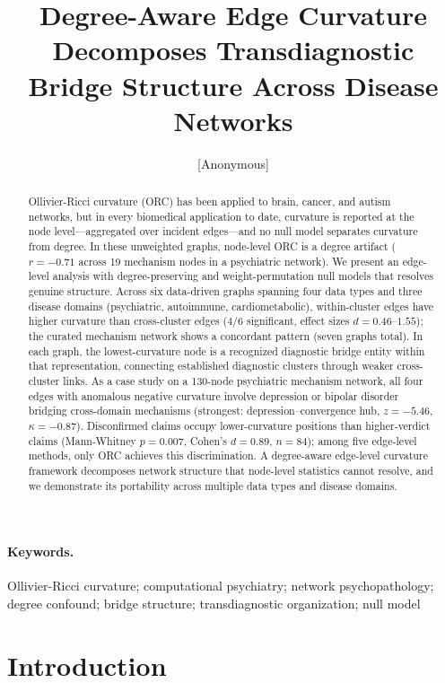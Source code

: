 \documentclass[11pt]{article}
\title{Degree-Aware Edge Curvature Decomposes Transdiagnostic Bridge Structure Across Disease Networks}
\author{[Anonymous]}
\affil{[Affiliation withheld for peer review]}
\date{}
\begin{document}
\maketitle

\begin{abstract}
Ollivier-Ricci curvature (ORC) has been applied to brain, cancer, and autism networks, but in every biomedical application to date, curvature is reported at the node level---aggregated over incident edges---and no null model separates curvature from degree. In these unweighted graphs, node-level ORC is a degree artifact ($r = -0.71$ across 19 mechanism nodes in a psychiatric network). We present an edge-level analysis with degree-preserving and weight-permutation null models that resolves genuine structure. Across six data-driven graphs spanning four data types and three disease domains (psychiatric, autoimmune, cardiometabolic), within-cluster edges have higher curvature than cross-cluster edges (4/6 significant, effect sizes $d = 0.46$--$1.55$); the curated mechanism network shows a concordant pattern (seven graphs total). In each graph, the lowest-curvature node is a recognized diagnostic bridge entity within that representation, connecting established diagnostic clusters through weaker cross-cluster links. As a case study on a 130-node psychiatric mechanism network, all four edges with anomalous negative curvature involve depression or bipolar disorder bridging cross-domain mechanisms (strongest: depression--convergence hub, $z = -5.46$, $\kappa = -0.87$). Disconfirmed claims occupy lower-curvature positions than higher-verdict claims (Mann-Whitney $p = 0.007$, Cohen's $d = 0.89$, $n = 84$); among five edge-level methods, only ORC achieves this discrimination. A degree-aware edge-level curvature framework decomposes network structure that node-level statistics cannot resolve, and we demonstrate its portability across multiple data types and disease domains.
\end{abstract}

\paragraph{Keywords.} Ollivier-Ricci curvature; computational psychiatry; network psychopathology; degree confound; bridge structure; transdiagnostic organization; null model

\section{Introduction}
\end{document}
